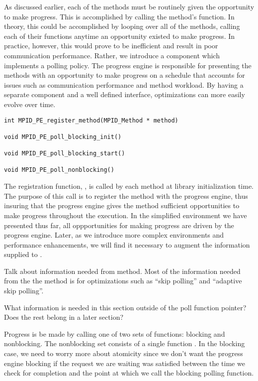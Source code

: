 As discussed earlier, each of the methods must be routinely given the
opportunity to make progress.  This is accomplished by calling the method's
 function.  In theory, this could be accomplished by looping over
all of the methods, calling each of their  functions anytime an
opportunity existed to make progress.  In practice, however, this would prove
to be inefficient and result in poor communication performance.  Rather, we
introduce a  component which implements a polling policy.
The progress engine is responsible for presenting the methods with an
opportunity to make progress on a schedule that accounts for issues such as
communication performance and method workload.  By having a separate component
and a well defined interface, optimizations can more easily evolve over time.

\begin{verbatim}
int MPID_PE_register_method(MPID_Method * method)

void MPID_PE_poll_blocking_init()

void MPID_PE_poll_blocking_start()

void MPID_PE_poll_nonblocking()
\end{verbatim}

The registration function, , is called by each
method at library initialization time.  The purpose of this call is to register
the method with the progress engine, thus insuring that the progress engine
gives the method sufficient opportunities to make progress throughout the
execution.  In the simplified environment we have presented thus far, all
oppportunities for making progress are driven by the progress engine.  Later,
as we introduce more complex environments and performance enhancements, we will
find it necessary to augment the information supplied to
.

\todo Talk about information needed from method.  Most of the information needed from the the method is for optimizations such as ``skip polling'' and ``adaptive skip polling''.

\Q What information is needed in this section outside of the poll function
pointer?  Does the rest belong in a later section?

Progress is be made by calling one of two sets of functions: blocking and
nonblocking.  The nonblocking set consists of a single function
.  In the blocking case, we need to worry more
about atomicity since we don't want the progress engine blocking if the
request we are waiting was satisfied between the time we check for completion
and the point at which we call the
blocking polling function.  

